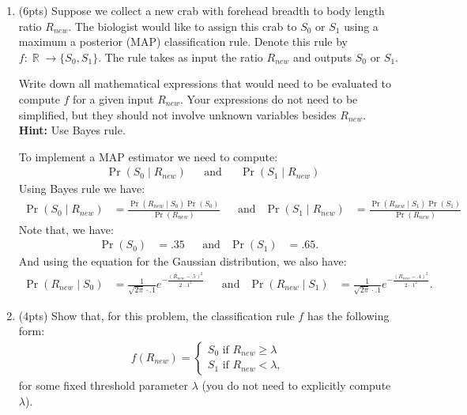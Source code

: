 \documentclass[10pt]{article}
\DeclareMathOperator{\R}{\mathbb{R}}
\begin{document}
\begin{enumerate}[label=(\alph*)]
	\item (6pts) Suppose we collect a new crab with forehead breadth to body length ratio $R_{new}$.  The biologist would like to assign this crab to $S_0$ or $S_1$ using a maximum a posterior (MAP) classification rule. Denote this rule by $f: \R\rightarrow \{S_0,S_1\}$. The rule takes as input the ratio $R_{new}$ and outputs $S_0$ or $S_1$.

	Write down all mathematical expressions that would need to be evaluated to compute $f$ for a given input $R_{new}$. Your expressions do not need to be simplified, but they should not involve unknown variables besides $R_{new}$. \textbf{Hint:} Use Bayes rule.
	

	
	\vspace{1em}
	\color{blue}
	To implement a MAP estimator we need to compute:
	\begin{align*}
	&\Pr(S_0 \mid R_{new}) & &\text{and} & &\Pr(S_1 \mid R_{new})
	\end{align*}
	Using Bayes rule we have:
	\begin{align*}
	\Pr(S_0 \mid R_{new}) & = \frac{\Pr(R_{new}\mid S_0)\Pr(S_0)}{\Pr(R_{new})} & &\text{and} & \Pr(S_1 \mid R_{new}) & = \frac{\Pr(R_{new}\mid S_1)\Pr(S_1)}{\Pr(R_{new})}
	\end{align*}
	Note that, we have:
	\begin{align*}
	\Pr(S_0) &=  .35 & &\text{and} & \Pr(S_1) &=  .65.
	\end{align*}
	And using the equation for the Gaussian distribution, we also have:
	\begin{align*}
	\Pr(R_{new}\mid S_0) &=  \frac{1}{\sqrt{2\pi}\cdot .1}e^{-\frac{(R_{new} - .5)^2}{2\cdot .1^2}} & &\text{and} & \Pr(R_{new}\mid S_1) &=  \frac{1}{\sqrt{2\pi}\cdot .1}e^{-\frac{(R_{new} - .4)^2}{2\cdot .1^2}}.
	\end{align*}
	\color{black}
	\vspace{1em}
	
	\item (4pts) Show that, for this problem, the classification rule $f$ has the following form:
	\begin{align*}
	f(R_{new}) = \begin{cases}
	S_0 \text{ if } R_{new} \geq \lambda \\
	S_1 \text{ if } R_{new} < \lambda,
	\end{cases}
	\end{align*}
	for some fixed threshold parameter $\lambda$ (you do not need to explicitly compute $\lambda$).
	

\end{enumerate}
\end{document}
